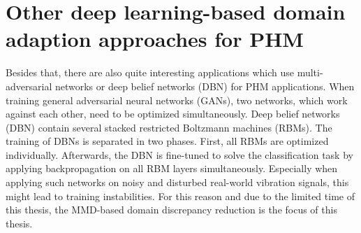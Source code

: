 \section{Other deep learning-based domain adaption approaches for PHM}
Besides that, there are also quite interesting applications which use multi-adversarial networks \cite{Zhang2019} or deep belief networks (DBN) \cite{ZHAO2019213} for PHM applications. When training general adversarial neural networks (GANs), two networks, which work against each other, need to be optimized simultaneously. Deep belief networks (DBN) contain several stacked restricted Boltzmann machines (RBMs). The training of DBNs is separated in two phases. First, all RBMs are optimized individually. Afterwards, the DBN is fine-tuned to solve the classification task by applying backpropagation on all RBM layers simultaneously. Especially when applying such networks on noisy and disturbed real-world vibration signals, this might lead to training instabilities. For this reason and due to the limited time of this thesis, the MMD-based domain discrepancy reduction is the focus of this thesis.
